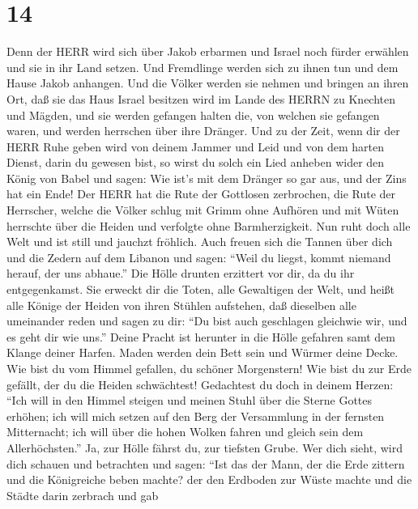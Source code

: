 \hypertarget{section-13}{%
\section{14}\label{section-13}}

 Denn der HERR wird sich über Jakob erbarmen und Israel noch
fürder erwählen und sie in ihr Land setzen. Und Fremdlinge werden sich
zu ihnen tun und dem Hause Jakob anhangen.  Und die Völker
werden sie nehmen und bringen an ihren Ort, daß sie das Haus Israel
besitzen wird im Lande des HERRN zu Knechten und Mägden, und sie werden
gefangen halten die, von welchen sie gefangen waren, und werden
herrschen über ihre Dränger.  Und zu der Zeit, wenn dir der
HERR Ruhe geben wird von deinem Jammer und Leid und von dem harten
Dienst, darin du gewesen bist,  so wirst du solch ein Lied
anheben wider den König von Babel und sagen: Wie ist's mit dem Dränger
so gar aus, und der Zins hat ein Ende!  Der HERR hat die
Rute der Gottlosen zerbrochen, die Rute der Herrscher, 
welche die Völker schlug mit Grimm ohne Aufhören und mit Wüten herrschte
über die Heiden und verfolgte ohne Barmherzigkeit.  Nun ruht
doch alle Welt und ist still und jauchzt fröhlich.  Auch
freuen sich die Tannen über dich und die Zedern auf dem Libanon und
sagen: ``Weil du liegst, kommt niemand herauf, der uns abhaue.''
 Die Hölle drunten erzittert vor dir, da du ihr
entgegenkamst. Sie erweckt dir die Toten, alle Gewaltigen der Welt, und
heißt alle Könige der Heiden von ihren Stühlen aufstehen, 
daß dieselben alle umeinander reden und sagen zu dir: ``Du bist auch
geschlagen gleichwie wir, und es geht dir wie uns.''  Deine
Pracht ist herunter in die Hölle gefahren samt dem Klange deiner Harfen.
Maden werden dein Bett sein und Würmer deine Decke.  Wie
bist du vom Himmel gefallen, du schöner Morgenstern! Wie bist du zur
Erde gefällt, der du die Heiden schwächtest!  Gedachtest du
doch in deinem Herzen: ``Ich will in den Himmel steigen und meinen Stuhl
über die Sterne Gottes erhöhen;  ich will mich setzen auf
den Berg der Versammlung in der fernsten Mitternacht; ich will über die
hohen Wolken fahren und gleich sein dem Allerhöchsten.'' 
Ja, zur Hölle fährst du, zur tiefsten Grube.  Wer dich
sieht, wird dich schauen und betrachten und sagen: ``Ist das der Mann,
der die Erde zittern und die Königreiche beben machte?  der
den Erdboden zur Wüste machte und die Städte darin zerbrach und gab
